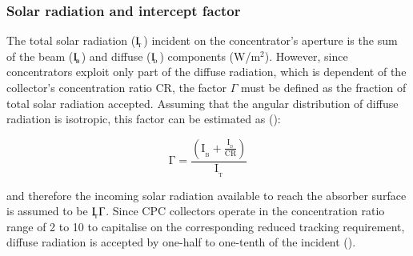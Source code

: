 %
%
%

\subsubsection{Solar radiation and intercept factor}

The total solar radiation ($\rm{I_{\!_{T}}}$) incident on the concentrator's aperture is the sum of the beam ($\rm{I_{\!_{B}}}$) and diffuse ($\rm{I_{\!_{D}}}$) components (W/m$^{2}$). However, since concentrators exploit only part of the diffuse radiation, which is dependent of the collector's concentration ratio CR, the factor $\Gamma$ must be defined as the fraction of total solar radiation accepted. Assuming that the angular distribution of diffuse radiation is isotropic, this factor can be estimated as (\cite{Rabl1980}):

\begin{equation}
	\mathrm{\Gamma  = \frac{\displaystyle {\left( {{I_{\!_B}} + \frac{{{I_{\!_D}}}}{CR}} \right)}}{{{I_{\!_T}}}}}
	\label{xi}
\end{equation} 

\noindent and therefore the incoming solar radiation available to reach the absorber surface is assumed to be $\rm{I_{\!_T}\Gamma}$. Since CPC collectors operate in the concentration ratio range of 2 to 10 to capitalise on the corresponding reduced tracking requirement, diffuse radiation is accepted by one-half to one-tenth of the incident (\cite{Goswami2015}). 

